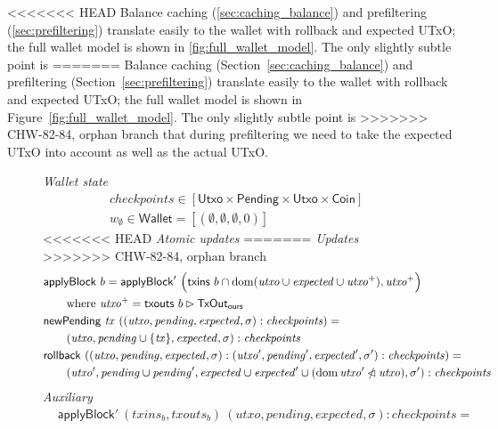 \documentclass{article}
\newcommand{\restrictdom}{\lhd}
\newcommand{\subtractdom}{\mathbin{\slashed{\restrictdom}}}
\newcommand{\restrictrange}{\rhd}
\DeclareMathOperator{\dom}{dom}
\theoremstyle{definition}{
  \newtheorem{lemma}{Lemma}[section] %
  \newtheorem{definition}[lemma]{Definition}
}
\theoremstyle{theorem}{
  \newtheorem{invariant}[lemma]{Invariant}
  \newtheorem{proofobligation}[lemma]{Proof Obligation}
}
\numberwithin{equation}{lemma}
\begin{document}
<<<<<<< HEAD
Balance caching (\cref{sec:caching_balance}) and prefiltering
(\cref{sec:prefiltering}) translate easily to the wallet with
rollback and expected UTxO; the full wallet model is shown in
\cref{fig:full_wallet_model}. The only slightly subtle point is
=======
Balance caching (Section~\ref{sec:caching_balance}) and prefiltering
(Section~\ref{sec:prefiltering}) translate easily to the wallet with
rollback and expected UTxO; the full wallet model is shown in
Figure~\ref{fig:full_wallet_model}. The only slightly subtle point is
>>>>>>> CHW-82-84, orphan branch
that during prefiltering we need to take the expected UTxO into account as
well as the actual UTxO.

\begin{figure}
%
\emph{Wallet state}
%
\begin{align*}
& \mathit{checkpoints} \in [\mathsf{Utxo} \times \mathsf{Pending} \times \mathsf{Utxo} \times \mathsf{Coin}] \\
& w_\emptyset \in \mathsf{Wallet} = [(\emptyset, \emptyset, \emptyset, 0)]
\end{align*}
%
<<<<<<< HEAD
\emph{Atomic updates}
=======
\emph{Updates}
>>>>>>> CHW-82-84, orphan branch
%
\begin{align*}
& \mathsf{applyBlock} ~ b
  = \mathsf{applyBlock}' ~ \Big( \mathsf{txins} ~ b \cap \dom (\mathit{utxo} \cup \mathit{expected} \cup \mathit{utxo}^+), \mathit{utxo}^+ \Bigr) \\
& \qquad \text{where~} \mathit{utxo}^+ = \mathsf{txouts} ~ b \restrictrange \mathsf{TxOut_{ours}} \\
& \mathsf{newPending} ~ \mathit{tx} ~ ((\mathit{utxo}, \mathit{pending}, \mathit{expected}, \sigma) : \mathit{checkpoints}) = \\
& \qquad (\mathit{utxo}, \mathit{pending} \cup \{\mathit{tx}\}, \mathit{expected}, \sigma) : \mathit{checkpoints} \\
& \mathsf{rollback} ~ ((\mathit{utxo}, \mathit{pending}, \mathit{expected}, \sigma) : (\mathit{utxo}', \mathit{pending}', \mathit{expected}', \sigma') : \mathit{checkpoints}) = \\
& \qquad (\mathit{utxo}', \mathit{pending} \cup \mathit{pending}', \mathit{expected} \cup \mathit{expected}' \cup (\dom \mathit{utxo}' \subtractdom \mathit{utxo}), \sigma') : \mathit{checkpoints} \\
\end{align*}
%
\emph{Auxiliary}
%
\begin{align*}
& \mathsf{applyBlock'} ~ (\mathit{txins}_b, \mathit{txouts}_b) ~ (\mathit{utxo}, \mathit{pending}, \mathit{expected}, \sigma) : \mathit{checkpoints} = \\

\end{align*}
\end{figure}
\end{document}

